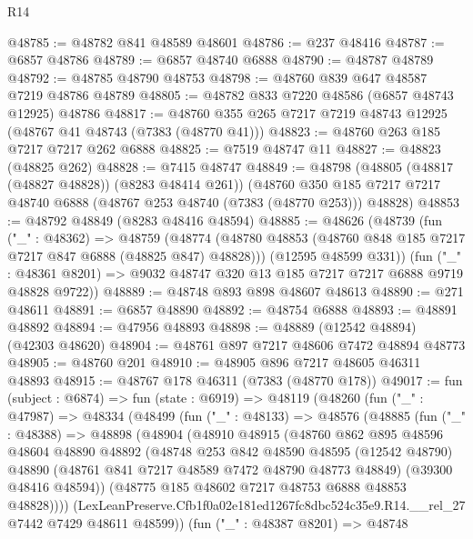 \begin{lexlean}{R14}
\begin{coremodule}
@48785 := @48782 @841 @48589 @48601
@48786 := @237 @48416
@48787 := @6857 @48786
@48789 := @6857 @48740 @6888
@48790 := @48787 @48789
@48792 := @48785 @48790 @48753
@48798 := @48760 @839 @647 @48587 @7219 @48786 @48789
@48805 := @48782 @833 @7220 @48586 (@6857 @48743 @12925) @48786
@48817 := @48760 @355 @265 @7217 @7219 @48743 @12925 (@48767 @41 @48743 (@7383 (@48770 @41)))
@48823 := @48760 @263 @185 @7217 @7217 @262 @6888
@48825 := @7519 @48747 @11
@48827 := @48823 (@48825 @262)
@48828 := @7415 @48747
@48849 := @48798
    (@48805 (@48817 (@48827 @48828)) (@8283 @48414 @261))
    (@48760 @350 @185 @7217 @7217 @48740 @6888 (@48767 @253 @48740 (@7383 (@48770 @253))) @48828)
@48853 := @48792 @48849 (@8283 @48416 @48594)
@48885 := @48626
    (@48739
      (fun ("_" : @48362) =>
      @48759
        (@48774 (@48780 @48853 (@48760 @848 @185 @7217 @7217 @847 @6888 (@48825 @847) @48828)))
        (@12595 @48599 @331))
      (fun ("_" : @48361 @8201) => @9032 @48747 @320 @13 @185 @7217 @7217 @6888 @9719 @48828 @9722))
@48889 := @48748 @893 @898 @48607 @48613
@48890 := @271 @48611
@48891 := @6857 @48890
@48892 := @48754 @6888
@48893 := @48891 @48892
@48894 := @47956 @48893
@48898 := @48889 (@12542 @48894) (@42303 @48620)
@48904 := @48761 @897 @7217 @48606 @7472 @48894 @48773
@48905 := @48760 @201
@48910 := @48905 @896 @7217 @48605 @46311 @48893
@48915 := @48767 @178 @46311 (@7383 (@48770 @178))
@49017 := fun (subject : @6874) =>
  fun (state : @6919) =>
  @48119
    (@48260
      (fun ("_" : @47987) =>
      @48334
        (@48499
          (fun ("_" : @48133) =>
          @48576
            (@48885
              (fun ("_" : @48388) =>
              @48898
                (@48904
                  (@48910
                    @48915
                    (@48760
                      @862
                      @895
                      @48596
                      @48604
                      @48890
                      @48892
                      (@48748
                        @253
                        @842
                        @48590
                        @48595
                        (@12542 @48790)
                        @48890
                        (@48761 @841 @7217 @48589 @7472 @48790 @48773 @48849)
                        (@39300 @48416 @48594))
                      (@48775 @185 @48602 @7217 @48753 @6888 @48853 @48828))))
                (LexLeanPreserve.Cfb1f0a02e181ed1267fc8dbc524c35e9.R14.__rel_27
                  @7442
                  @7429
                  @48611
                  @48599))
              (fun ("_" : @48387 @8201) =>
              @48748

\end{coremodule}
\end{lexlean}
